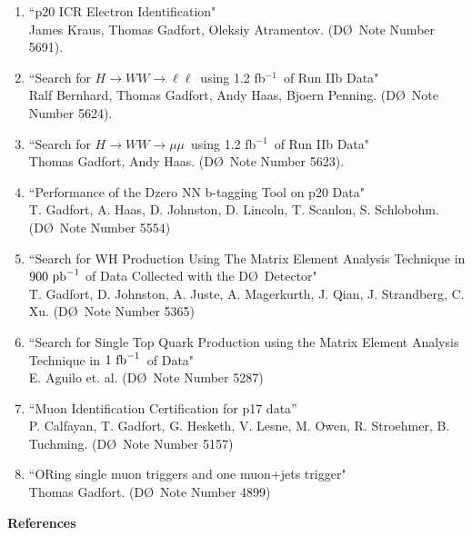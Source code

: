 \documentclass[12pt]{article}
\newcommand{\dzero}{D\O}
\begin{document}
\begin{enumerate}
\item{``p20 ICR Electron Identification"\\
James Kraus, Thomas Gadfort, Oleksiy Atramentov. (\dzero~Note Number 5691).}

\item{``Search for $H\rightarrow WW\rightarrow \ell\ell$~using 1.2 fb$^{-1}$~of Run IIb Data" \\
Ralf Bernhard, Thomas Gadfort, Andy Haas, Bjoern Penning. (\dzero~Note Number 5624).}

\item{``Search for $H\rightarrow WW\rightarrow \mu\mu$~using 1.2 fb$^{-1}$~of Run IIb Data" \\
Thomas Gadfort, Andy Haas. (\dzero~Note Number 5623).}

\item{``Performance of the Dzero NN b-tagging Tool on p20 Data" \\
T. Gadfort, A. Haas, D. Johnston, D. Lincoln, T. Scanlon, S. Schlobohm. (\dzero~Note Number 5554)}

\item{``Search for WH Production Using The Matrix Element Analysis Technique in $900~\rm{pb}^{-1}$ of Data Collected with the \dzero~Detector" \\
T. Gadfort, D. Johnston, A. Juste, A. Magerkurth, J. Qian, J. Strandberg, C. Xu. (\dzero~Note Number 5365)}

\item{``Search for Single Top Quark Production using the Matrix Element Analysis Technique in $1~\rm{fb}^{-1}$~of Data" \\
E. Aguilo et. al. (\dzero~Note Number 5287)}

\item{``Muon Identification Certification for p17 data'' \\
P. Calfayan, T. Gadfort, G. Hesketh, V. Lesne, M. Owen, R. Stroehmer, B. Tuchming. (\dzero~Note Number 5157)} 

\item{``ORing single muon triggers and one muon+jets trigger" \\
Thomas Gadfort. (\dzero~Note Number 4899)}

\end{enumerate}

\newpage
\noindent
{\Large \textbf{References}}
\end{document}
